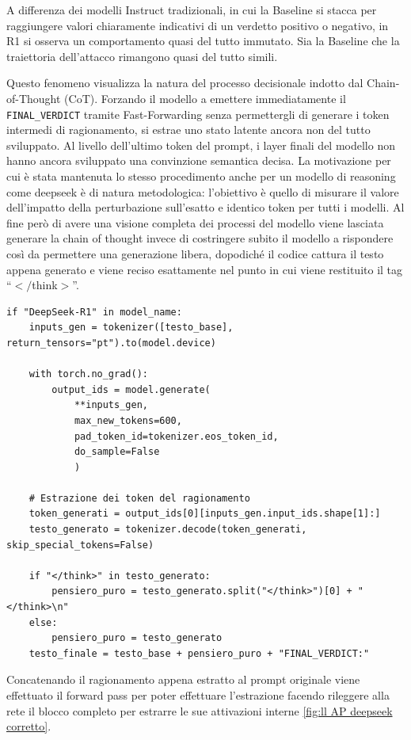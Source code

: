 A differenza dei modelli Instruct tradizionali, in cui la Baseline si stacca per raggiungere valori chiaramente indicativi di un verdetto positivo o negativo, in R1 si osserva un comportamento quasi del tutto immutato. Sia la Baseline che la traiettoria dell'attacco rimangono quasi del tutto simili.

Questo fenomeno visualizza la natura del processo decisionale indotto dal Chain-of-Thought (CoT). Forzando il modello a emettere immediatamente il \texttt{FINAL\_VERDICT} tramite Fast-Forwarding senza permettergli di generare i token intermedi di ragionamento, si estrae uno stato latente ancora non del tutto sviluppato. Al livello dell'ultimo token del prompt, i layer finali del modello non hanno ancora sviluppato una convinzione semantica decisa. 
La motivazione per cui è stata mantenuta lo stesso procedimento anche per un modello di reasoning come deepseek è di natura metodologica: l'obiettivo è quello di misurare il valore dell'impatto della perturbazione sull'esatto e identico token per tutti i modelli.
Al fine però di avere una visione completa dei processi del modello viene lasciata generare la chain of thought invece di costringere subito il modello a rispondere così da permettere una generazione libera, dopodiché il codice cattura il testo appena generato e viene reciso esattamente nel punto in cui viene restituito il tag \enquote{$</$think$>$}.

\begin{verbatim}
if "DeepSeek-R1" in model_name:
    inputs_gen = tokenizer([testo_base], return_tensors="pt").to(model.device)
                
    with torch.no_grad():
        output_ids = model.generate(
            **inputs_gen,
            max_new_tokens=600,
            pad_token_id=tokenizer.eos_token_id,
            do_sample=False
            )
                
    # Estrazione dei token del ragionamento
    token_generati = output_ids[0][inputs_gen.input_ids.shape[1]:]
    testo_generato = tokenizer.decode(token_generati, skip_special_tokens=False)

    if "</think>" in testo_generato:
        pensiero_puro = testo_generato.split("</think>")[0] + "</think>\n"
    else:
        pensiero_puro = testo_generato
    testo_finale = testo_base + pensiero_puro + "FINAL_VERDICT:"
\end{verbatim}

Concatenando il ragionamento appena estratto al prompt originale viene effettuato il forward pass per poter effettuare l'estrazione facendo rileggere alla rete il blocco completo per estrarre le sue attivazioni interne \ref{fig:ll AP deepseek corretto}.

